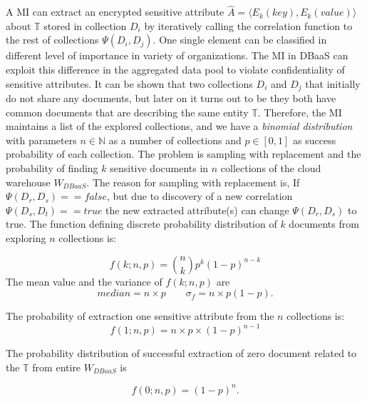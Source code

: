 \noindent A MI can extract an encrypted sensitive attribute $\hat{A}=\langle E_k(key), E_k(value) \rangle$ about $\mathbb{T}$ stored in collection $D_i$ by iteratively calling the correlation function to the rest of collections $\Psi (D_i, D_j)$. One single element can be classified in different level of importance in variety of organizations. The MI in DBaaS can exploit this  difference in the aggregated data pool to violate confidentiality of sensitive attributes. It can be shown that two collections $D_i$ and $D_j$ that initially do not share any documents, but later on it turns out to be they both have common documents that are describing the same entity $\mathbb{T}$. Therefore, the MI maintains a list of the explored collections, and we have a \emph{binomial distribution} with parameters $n \in \mathbb{N}$ as a number of collections and $p \in [0,1]$ as success probability of each collection. The problem is sampling with replacement and the probability of finding $k$ sensitive documents in $n$ collections of the cloud warehouse $W_{DBaaS}$. The reason for sampling with replacement is, If $\Psi(D_r, D_s)==false$, but due to discovery of a new correlation $\Psi(D_s, D_t)==true$ the new extracted attribute(s) can change $\Psi(D_r, D_s)$ to true. The function defining discrete probability distribution of $k$ documents from exploring $n$ collections is:   

\begin{equation}
\label{binomialDistribution}
f(k;n,p) = {{n} \choose {k}}p^{k}(1-p)^{n-k}
\end{equation}
The mean value and the variance of $f(k;n,p)$ are
\begin{equation}
median = n \times p  \qquad \sigma_{f} = n \times p (1-p).
\end{equation}

The probability of extraction one sensitive attribute from the $n$ collections is:
\begin{equation}
\label{oneSuccess}
f(1;n,p) = n\times p\times(1-p)^{n-1}
\end{equation}

The probability distribution of successful extraction of zero document related to the $\mathbb{T}$ from  entire $W_{DBaaS}$ is

\begin{equation}
\label{zeroSuccess}
f(0;n,p) = (1-p)^{n}.
\end{equation}
 
